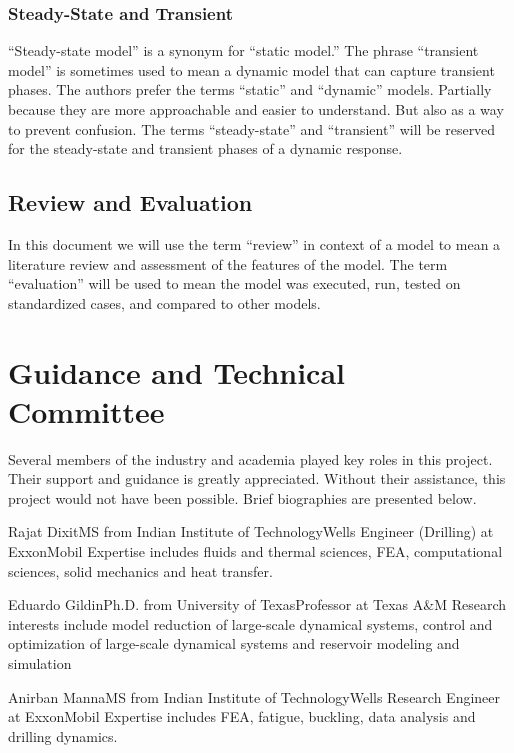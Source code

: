 \subsubsection{Steady-State and Transient}
``Steady-state model'' is a synonym for ``static model.'' The phrase ``transient model'' is sometimes used to mean a dynamic model that can capture transient phases.  The authors prefer the terms ``static'' and ``dynamic'' models.  Partially because they are more approachable and easier to understand.  But also as a way to prevent confusion.  The terms ``steady-state'' and ``transient'' will be reserved for the steady-state and transient phases of a dynamic response.

\subsection{Review and Evaluation}
In this document we will use the term ``review'' in context of a model to mean a literature review and assessment of the features of the model.  The term ``evaluation'' will be used to mean the model was executed, run, tested on standardized cases, and compared to other models.

\section{Guidance and Technical Committee}
Several members of the industry and academia played key roles in this project.  Their support and guidance is greatly appreciated.  Without their assistance, this project would not have been possible.  Brief biographies are presented below.

\begin{committeemember}{Rajat Dixit}{MS from Indian Institute of Technology}{Wells Engineer (Drilling) at ExxonMobil}
Expertise includes fluids and thermal sciences, FEA, computational sciences, solid mechanics and heat transfer.
\end{committeemember}

\begin{committeemember}{Eduardo Gildin}{Ph.D. from University of Texas}{Professor at Texas A\&M}
Research interests include model reduction of large-scale dynamical systems, control and optimization of large-scale dynamical systems and reservoir modeling and simulation
\end{committeemember}

\begin{committeemember}{Anirban Manna}{MS from Indian Institute of Technology}{Wells Research Engineer at ExxonMobil}
Expertise includes FEA, fatigue, buckling, data analysis and drilling dynamics.
\end{committeemember}


